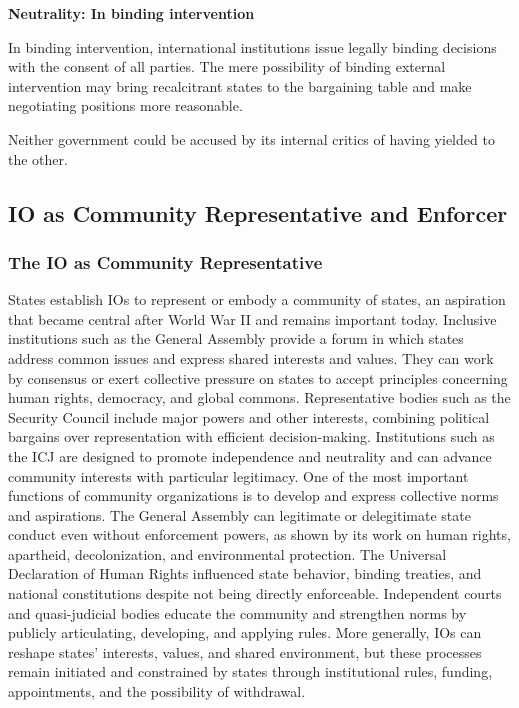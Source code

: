 \textbf{Neutrality: In binding intervention}

In binding intervention, international institutions issue legally binding decisions with the consent of all parties. The mere possibility of binding external intervention may bring recalcitrant states to the bargaining table and make negotiating positions more reasonable.

Neither government could be accused by its internal critics of having yielded to the other.

\subsection{IO as Community Representative and Enforcer}

\subsubsection{The IO as Community Representative}
States establish IOs to represent or embody a community of states, an aspiration that became central after World War II and remains important today. Inclusive institutions such as the General Assembly provide a forum in which states address common issues and express shared interests and values. They can work by consensus or exert collective pressure on states to accept principles concerning human rights, democracy, and global commons. Representative bodies such as the Security Council include major powers and other interests, combining political bargains over representation with efficient decision-making. Institutions such as the ICJ are designed to promote independence and neutrality and can advance community interests with particular legitimacy. One of the most important functions of community organizations is to develop and express collective norms and aspirations. The General Assembly can legitimate or delegitimate state conduct even without enforcement powers, as shown by its work on human rights, apartheid, decolonization, and environmental protection. The Universal Declaration of Human Rights influenced state behavior, binding treaties, and national constitutions despite not being directly enforceable. Independent courts and quasi-judicial bodies educate the community and strengthen norms by publicly articulating, developing, and applying rules. More generally, IOs can reshape states' interests, values, and shared environment, but these processes remain initiated and constrained by states through institutional rules, funding, appointments, and the possibility of withdrawal.

